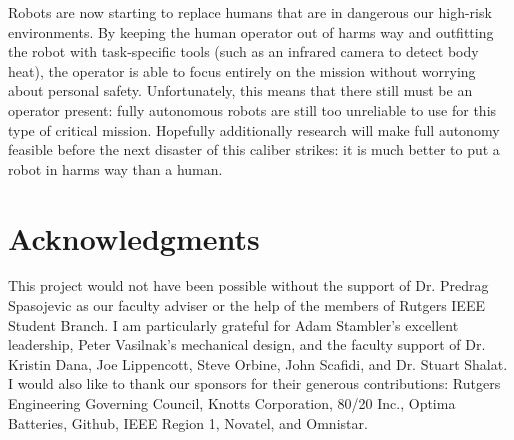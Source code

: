 \documentclass[twocolumn,11pt]{article}
\begin{document}
Robots are now starting to replace humans that are in dangerous our high-risk
environments. By keeping the human operator out of harms way and outfitting the
robot with task-specific tools (such as an infrared camera to detect body
heat), the operator is able to focus entirely on the mission without worrying
about personal safety. Unfortunately, this means that there still must be an
operator present: fully autonomous robots are still too unreliable to use for
this type of critical mission. Hopefully additionally research will make full
autonomy feasible before the next disaster of this caliber strikes: it is much
better to put a robot in harms way than a human.

\section{Acknowledgments}
This project would not have been possible without the support of Dr. Predrag
Spasojevic as our faculty adviser or the help of the members of Rutgers IEEE
Student Branch. I am particularly grateful for Adam Stambler's excellent
leadership, Peter Vasilnak's mechanical design, and the faculty support of Dr.
Kristin Dana, Joe Lippencott, Steve Orbine, John Scafidi, and Dr. Stuart
Shalat. I would also like to thank our sponsors for their generous
contributions: Rutgers Engineering Governing Council, Knotts Corporation, 80/20
Inc., Optima Batteries, Github, IEEE Region 1, Novatel, and Omnistar.

{\footnotesize
{}

}
\end{document}

